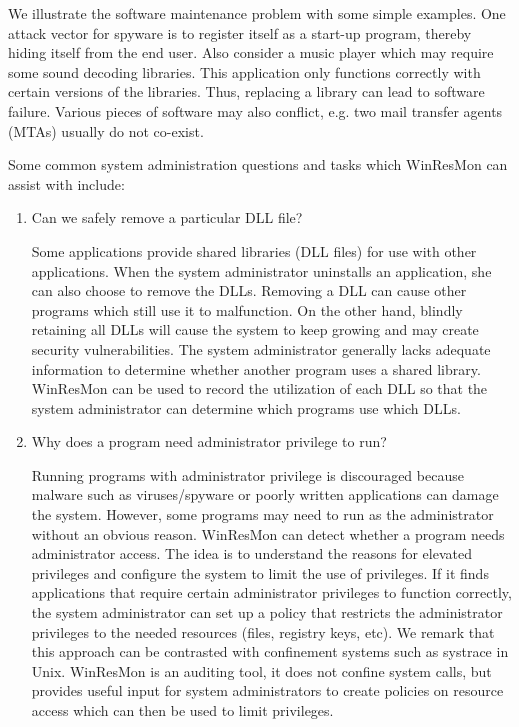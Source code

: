 We illustrate the software maintenance problem with some simple examples.  One
attack vector for spyware is to register itself as a start-up program, thereby
hiding itself from the end user.  Also consider a music player which may
require some sound decoding libraries.  This application only functions
correctly with certain versions of the libraries.  Thus, replacing a library
can lead to software failure.  Various pieces of software may also conflict,
e.g.  two mail transfer agents (MTAs) usually do not co-exist.

Some common system administration questions and tasks which WinResMon 
can assist with include:

\begin{enumerate}

\item Can we safely remove a particular DLL file?

Some applications provide shared libraries (DLL files) for use with other
applications.  When the system administrator uninstalls an application, she
can also choose to remove the DLLs.  Removing a DLL can cause other programs
which still use it to malfunction.  On the other hand, blindly retaining all
DLLs will cause the system to keep growing and may create security
vulnerabilities.  The system administrator generally lacks adequate
information to determine whether another program uses a shared
library. WinResMon can be used to record the utilization of each DLL so that the
system administrator can determine which programs use which DLLs.

\item Why does a program need administrator privilege to run?

Running programs with administrator privilege is discouraged because malware
such as viruses/spyware or poorly written applications can damage the system.
However, some programs may need to run as the administrator without an obvious
reason.  WinResMon can detect whether a program needs administrator access.  The
idea is to understand the reasons for elevated privileges and configure the
system to limit the use of privileges.  If it finds applications that require
certain administrator privileges to function correctly, the system
administrator can set up a policy that restricts the administrator privileges
to the needed resources (files, registry keys, etc).  
We remark that this approach can be contrasted with confinement systems
such as systrace \cite{provos2003improving} in Unix.
WinResMon is an auditing tool, it does not confine system calls, but
provides useful input for system administrators to create policies 
on resource access which can then be used to limit privileges.


\end{enumerate}

